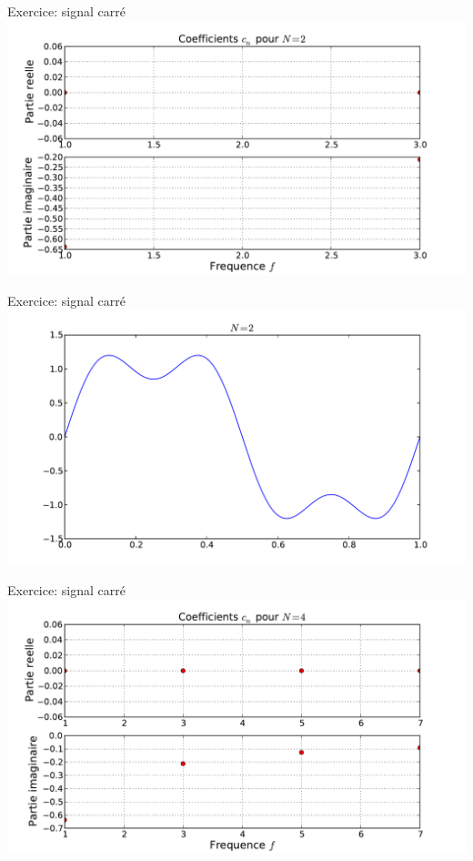 \documentclass[8pt,a4paper]{beamer}
\begin{document}
\begin{frame}{Exercice: signal carré}
\includegraphics[width=1.\textwidth]{figures/serieF_carre_c_2.pdf} \\
\end{frame}

\begin{frame}{Exercice: signal carré}
\includegraphics[width=1.\textwidth]{figures/serieF_carre_2.pdf}\\
\end{frame}

\begin{frame}{Exercice: signal carré}
\includegraphics[width=1.\textwidth]{figures/serieF_carre_c_4.pdf} \\
\end{frame}
\end{document}
